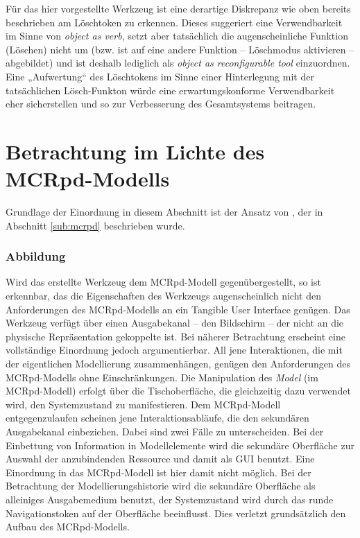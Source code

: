 Für das hier vorgestellte Werkzeug ist eine derartige Diskrepanz wie oben bereits beschrieben am Löschtoken zu erkennen. Dieses suggeriert eine Verwendbarkeit im Sinne von \emph{object as verb}, setzt aber tatsächlich die augenscheinliche Funktion (Löschen) nicht um (bzw. ist auf eine andere Funktion -- Löschmodus aktivieren -- abgebildet) und ist deshalb lediglich als \emph{object as reconfigurable tool} einzuordnen. Eine „Aufwertung“ des Löschtokens im Sinne einer Hinterlegung mit der tatsächlichen Lösch-Funkton würde eine erwartungskonforme Verwendbarkeit eher sicherstellen und so zur Verbesserung des Gesamtsystems beitragen.


\section{Betrachtung im Lichte des MCRpd-Modells} %
\label{sec:betrachtung_im_lichte_des_mcrpd_modells}

Grundlage der Einordnung in diesem Abschnitt ist der Ansatz von \citet{Ullmer00}, der in Abschnitt \ref{sub:mcrpd} beschrieben wurde.

\subsubsection{Abbildung}

Wird das erstellte Werkzeug dem \gls{MCRpd}-Modell gegenübergestellt, so ist erkennbar, das die Eigenschaften des Werkzeugs augenscheinlich nicht den Anforderungen des \gls{MCRpd}-Modells an ein Tangible User Interface genügen. Das Werkzeug verfügt über einen Ausgabekanal -- den Bildschirm -- der nicht an die physische Repräsentation gekoppelte ist. Bei näherer Betrachtung erscheint eine vollständige Einordnung jedoch argumentierbar. All jene Interaktionen, die mit der eigentlichen Modellierung zusammenhängen, genügen den Anforderungen des \gls{MCRpd}-Modells ohne Einschränkungen. Die Manipulation des \emph{Model} (im \gls{MCRpd}-Modell) erfolgt über die Tischoberfläche, die gleichzeitig dazu verwendet wird, den Systemzustand zu manifestieren. Dem \gls{MCRpd}-Modell entgegenzulaufen scheinen jene Interaktionsabläufe, die den sekundären Ausgabekanal einbeziehen. Dabei sind zwei Fälle zu unterscheiden. Bei der Einbettung von Information in Modellelemente wird die sekundäre Oberfläche zur Auswahl der anzubindenden Ressource und damit als \gls{GUI} benutzt. Eine Einordnung in das \gls{MCRpd}-Modell ist hier damit nicht möglich. Bei der Betrachtung der Modellierungshistorie wird die sekundäre Oberfläche als alleiniges Ausgabemedium benutzt, der Systemzustand wird durch das runde Navigationstoken auf der Oberfläche beeinflusst. Dies verletzt grundsätzlich den Aufbau des MCRpd-Modells.

